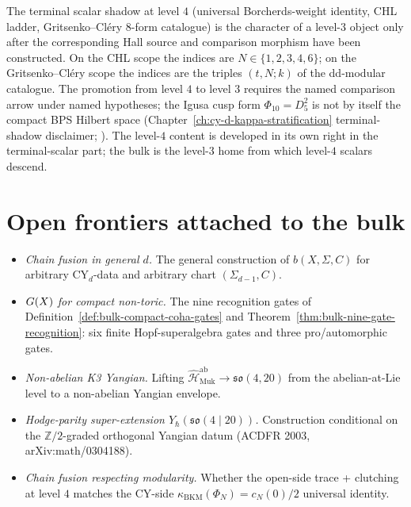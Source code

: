 The terminal scalar shadow at level $4$ (universal Borcherds-weight
identity, CHL ladder, Gritsenko--Cl\'ery $8$-form catalogue) is the
character of a level-$3$ object only after the corresponding Hall source
and comparison morphism have been constructed. On the CHL scope the
indices are \(N\in\{1,2,3,4,6\}\); on the Gritsenko--Cl\'ery scope the
indices are the triples \((t,N;k)\) of the dd-modular catalogue. The
promotion from level $4$ to level $3$ requires the
named comparison arrow under named hypotheses; the Igusa cusp form
$\Phi_{10} = D_{5}^{2}$ is not by itself the compact BPS Hilbert space
(Chapter~\ref{ch:cy-d-kappa-stratification} terminal-shadow
disclaimer; \cite{LorgatIgusaCuspForm}). The level-$4$
content is developed in its own right in the terminal-scalar part; the
bulk is the level-$3$ home from which level-$4$ scalars descend.

\section{Open frontiers attached to the bulk}
\label{sec:bulk-open-frontiers}

\begin{itemize}[leftmargin=1.6em,itemsep=2pt]
\item \emph{Chain fusion in general $d$.} The general construction of
$b(X, \Sigma, C)$ for arbitrary CY$_d$-data and arbitrary chart
$(\Sigma_{d-1}, C)$.
\item \emph{$G(X)$ for compact non-toric.} The nine recognition
gates of Definition~\ref{def:bulk-compact-coha-gates} and
Theorem~\ref{thm:bulk-nine-gate-recognition}: six finite
Hopf-superalgebra gates and three pro/automorphic gates.
\item \emph{Non-abelian K3 Yangian.} Lifting
$\widehat{\mathcal H}_{\mathrm{Muk}}^{\mathrm{ab}} \to \mathfrak{so}(4,
20)$ from the abelian-at-Lie level to a non-abelian Yangian envelope.
\item \emph{Hodge-parity super-extension $Y_{\hbar}(\mathfrak{so}(4
\mid 20))$.} Construction conditional on the $\mathbb Z/2$-graded
orthogonal Yangian datum (ACDFR 2003, arXiv:math/0304188).
\item \emph{Chain fusion respecting modularity.} Whether the open-side
trace + clutching at level $4$ matches the CY-side
$\kappa_{\mathrm{BKM}}(\Phi_N) = c_{N}(0)/2$ universal identity.
\end{itemize}

